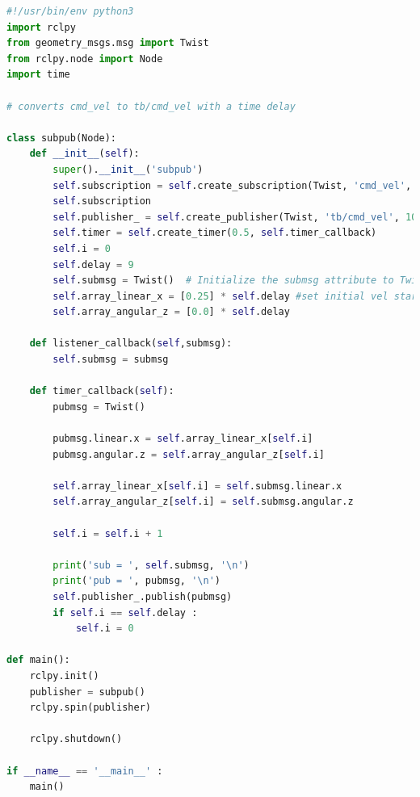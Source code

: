  \begin{lstlisting}[language=Python, caption=Platooning algortihem Time Delay]
#!/usr/bin/env python3
import rclpy 
from geometry_msgs.msg import Twist 
from rclpy.node import Node
import time 

# converts cmd_vel to tb/cmd_vel with a time delay

class subpub(Node):
    def __init__(self):
        super().__init__('subpub')
        self.subscription = self.create_subscription(Twist, 'cmd_vel', self.listener_callback, 10)
        self.subscription
        self.publisher_ = self.create_publisher(Twist, 'tb/cmd_vel', 10)
        self.timer = self.create_timer(0.5, self.timer_callback)
        self.i = 0
        self.delay = 9
        self.submsg = Twist()  # Initialize the submsg attribute to Twist() 
        self.array_linear_x = [0.25] * self.delay #set initial vel start here 
        self.array_angular_z = [0.0] * self.delay

    def listener_callback(self,submsg):
        self.submsg = submsg

    def timer_callback(self):
        pubmsg = Twist()

        pubmsg.linear.x = self.array_linear_x[self.i] 
        pubmsg.angular.z = self.array_angular_z[self.i]
        
        self.array_linear_x[self.i] = self.submsg.linear.x
        self.array_angular_z[self.i] = self.submsg.angular.z
        
        self.i = self.i + 1 

        print('sub = ', self.submsg, '\n')
        print('pub = ', pubmsg, '\n')
        self.publisher_.publish(pubmsg)
        if self.i == self.delay :
            self.i = 0

def main(): 
    rclpy.init()
    publisher = subpub()  
    rclpy.spin(publisher)   
            
    rclpy.shutdown()

if __name__ == '__main__' : 
    main()          
\end{lstlisting}

